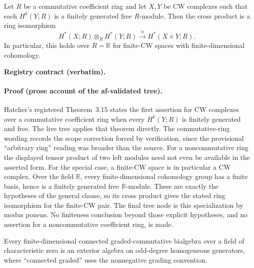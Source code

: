 \begin{lemma}\label{lem:topology-kunneth-cross-product}
Let $R$ be a commutative coefficient ring and let $X,Y$ be CW complexes such that
each $H^k(Y;R)$ is a finitely generated free $R$-module.  Then the cross product is a
ring isomorphism
\[
  H^*(X;R)\otimes_R H^*(Y;R)\xrightarrow{\ \cong\ }H^*(X\times Y;R).
\]
In particular, this holds over $R=\mathbb R$ for finite-CW spaces with
finite-dimensional cohomology.
\end{lemma}

\noindent\textbf{Registry contract (verbatim).}

\paragraph{Proof (prose account of the af-validated tree).}
Hatcher's registered Theorem~3.15 states the first assertion for CW complexes over
a commutative coefficient ring when every $H^k(Y;R)$ is finitely generated and free.
The live tree applies that theorem directly.  The commutative-ring wording records
the scope correction forced by verification, since the provisional ``arbitrary
ring'' reading was broader than the source.
For a noncommutative ring the displayed tensor product of two left modules need
not even be available in the asserted form.
For the special case, a finite-CW space is in particular a CW complex.
Over the field $\mathbb R$, every finite-dimensional
cohomology group has a finite basis, hence is a finitely generated free
$\mathbb R$-module.  These are exactly the hypotheses of the general clause,
so its cross product gives the stated ring isomorphism for the finite-CW pair.
The final tree node is this specialization by modus ponens.
No finiteness conclusion beyond those explicit hypotheses, and no assertion for
a noncommutative coefficient ring, is made.

\begin{lemma}\label{lem:topology-hopf-structure}
Every finite-dimensional connected graded-commutative bialgebra over a field of
characteristic zero is an exterior algebra on odd-degree homogeneous generators,
where ``connected graded'' uses the nonnegative grading convention.
\end{lemma}

